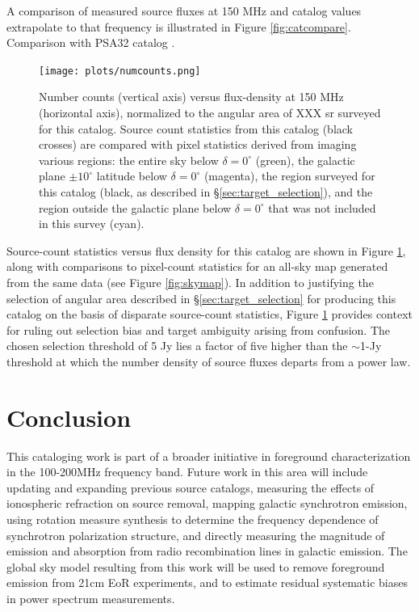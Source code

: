 \documentclass[preprint]{aastex}
\begin{document}
A comparison of measured source fluxes at 150 MHz and catalog values extrapolate to that frequency
is illustrated in Figure \ref{fig:catcompare}.
Comparison with PSA32 catalog \citep{jacobs_et_al2011}.

\begin{figure}\centering
\texttt{[image: plots/numcounts.png]}
\caption{Number counts (vertical axis) versus flux-density at 150 MHz (horizontal axis), normalized
to the angular area of XXX sr surveyed for this catalog.  Source count statistics from this
catalog (black crosses) are compared with pixel statistics derived from imaging various regions:
the entire sky below $\delta=0^\circ$ (green), the galactic plane $\pm10^\circ$ latitude below
$\delta=0^\circ$ (magenta), the region surveyed for this catalog (black, as described 
in \S\ref{sec:target_selection}), and the region outside the galactic plane below $\delta=0^\circ$
that was not included in this survey (cyan).
}\label{fig:numcounts}
\end{figure}

Source-count statistics versus flux density for this catalog are shown in 
Figure \ref{fig:numcounts}, along with comparisons to pixel-count statistics for an all-sky map
generated from the same data (see Figure \ref{fig:skymap}).  In addition to justifying the
selection of angular area described in \S\ref{sec:target_selection} for producing this 
catalog on the basis of disparate source-count statistics, Figure \ref{fig:numcounts} 
provides context for ruling out selection bias and target ambiguity arising from confusion.
The chosen selection threshold of 5 Jy lies a factor of five higher than the $\sim$1-Jy threshold
at which the number density of source fluxes departs from a power law.

\section{Conclusion}

This cataloging work is part of a broader initiative in foreground characterization 
in the 100-200MHz frequency band.  Future work in this area 
will include updating
and expanding previous source catalogs, measuring the effects of
ionospheric refraction on source removal, mapping galactic synchrotron
emission, using rotation measure synthesis to determine the frequency
dependence of synchrotron polarization structure, and directly
measuring the magnitude of emission and absorption from radio
recombination lines in galactic emission.  The global sky model
resulting from this work will be used to remove foreground emission
from 21cm EoR experiments, and to estimate residual systematic biases in power
spectrum measurements.  
\end{document}
